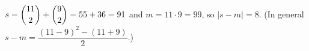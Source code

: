 $s=\dbinom{11}{2}+\dbinom92=55+36=91$ and $m=11\cdot9=99$, so $|s-m|=\boxed{8}$. (In general $s-m=\dfrac{(11-9)^2-(11+9)}{2}$.)
